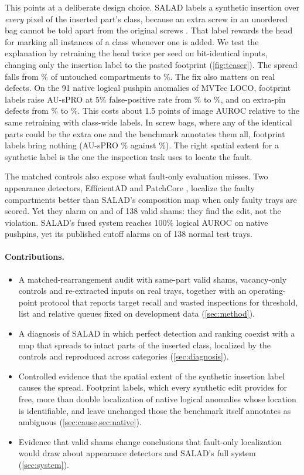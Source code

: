 This points at a deliberate design choice. SALAD labels a synthetic insertion over \emph{every} pixel of the inserted part's class, because an extra screw in an unordered bag cannot be told apart from the original screws \cite{fucka2025}. That label rewards the head for marking all instances of a class whenever one is added. We test the explanation by retraining the head twice per seed on bit-identical inputs, changing only the insertion label to the pasted footprint (\cref{fig:teaser}). The spread falls from \cwSpread\% of untouched compartments to \fpSpread\%. The fix also matters on real defects. On the 91 native logical pushpin anomalies of MVTec LOCO, footprint labels raise AU-sPRO at 5\% false-positive rate from \natPPcw\% to \natPPfp\%, and on extra-pin defects from \natAddCW\% to \natAddFP\%. This costs about 1.5 points of image AUROC relative to the same retraining with class-wide labels. In screw bags, where any of the identical parts could be the extra one and the benchmark annotates them all, footprint labels bring nothing (AU-sPRO \natSBfp\% against \natSBcw\%). The right spatial extent for a synthetic label is the one the inspection task uses to locate the fault.

The matched controls also expose what fault-only evaluation misses. Two appearance detectors, EfficientAD \cite{batzner2024} and PatchCore \cite{roth2022}, localize the faulty compartments better than SALAD's composition map when only faulty trays are scored. Yet they alarm on \eadSham{} and \pcSham{} of 138 valid shams: they find the edit, not the violation. SALAD's fused system reaches 100\% logical AUROC on native pushpins, yet its published cutoff alarms on \fullSrcVal{} of 138 normal test trays.

\paragraph{Contributions.}
\begin{itemize}\setlength\itemsep{1pt}
\item A matched-rearrangement audit with same-part valid shams, vacancy-only controls and re-extracted inputs on real trays, together with an operating-point protocol that reports target recall and wasted inspections for threshold, list and relative queues fixed on development data (\cref{sec:method}).
\item A diagnosis of SALAD in which perfect detection and ranking coexist with a map that spreads to intact parts of the inserted class, localized by the controls and reproduced across categories (\cref{sec:diagnosis}).
\item Controlled evidence that the spatial extent of the synthetic insertion label causes the spread. Footprint labels, which every synthetic edit provides for free, more than double localization of native logical anomalies whose location is identifiable, and leave unchanged those the benchmark itself annotates as ambiguous (\cref{sec:cause,sec:native}).
\item Evidence that valid shams change conclusions that fault-only localization would draw about appearance detectors and SALAD's full system (\cref{sec:system}).
\end{itemize}

